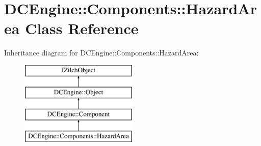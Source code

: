 \hypertarget{classDCEngine_1_1Components_1_1HazardArea}{\section{D\-C\-Engine\-:\-:Components\-:\-:Hazard\-Area Class Reference}
\label{classDCEngine_1_1Components_1_1HazardArea}
}
Inheritance diagram for D\-C\-Engine\-:\-:Components\-:\-:Hazard\-Area\-:\begin{figure}[H]
\begin{center}
\leavevmode
\includegraphics[height=4.000000cm]{classDCEngine_1_1Components_1_1HazardArea}
\end{center}
\end{figure}
